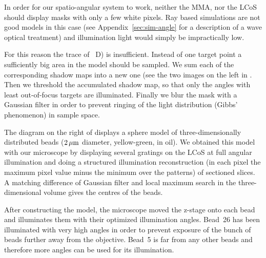 In order for our spatio-angular system to work, neither the MMA, nor
the LCoS should display masks with only a few white pixels. Ray based
simulations are not good models in this case (see
Appendix~\ref{sec:sim-angle} for a description of a wave optical
treatment) and illumination light would simply be impractically low.

For this reason the trace of ~D) is
insufficient. Instead of one target point a sufficiently big area in
the model should be sampled. We sum each of the corresponding shadow
maps into a new one (see the two images on the left in
. Then we threshold the
accumulated shadow map, so that only the angles with least
out-of-focus targets are illuminated. Finally we blur the mask with a
Gaussian filter in order to prevent ringing of the light distribution
(Gibbs' phenomenon) in sample space.

The diagram on the right of 
displays a sphere model of three-dimensionally distributed beads
($\unit[2]{\mu m}$ diameter, yellow-green, in oil). We obtained this
model with our microscope by displaying several gratings on the LCoS
at full angular illumination and doing a structured illumination
reconstruction (in each pixel the maximum pixel value minus the
minimum over the patterns) of sectioned slices. A matching difference
of Gaussian filter and local maximum search in the three-dimensional
volume gives the centres of the beads.

After constructing the model, the microscope moved the z-stage onto
each bead and illuminates them with their optimized illumination
angles. Bead~26 has been illuminated with very high angles in order to
prevent exposure of the bunch of beads further away from the
objective. Bead~5 is far from any other beads and therefore more
angles can be used for its illumination.



